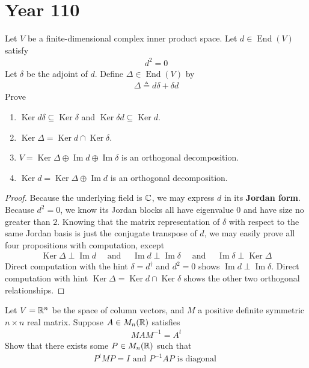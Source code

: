 \documentclass{report}
\begin{document}
\section{Year 110}
\begin{question}{}{}
Let $V$ be a finite-dimensional complex inner product space. Let $d\in \operatorname{End}(V)$ satisfy 
\begin{align*}
d^2=0
\end{align*}
Let $\delta$ be the adjoint of $d$. Define $\Delta \in \operatorname{End}(V)$ by 
\begin{align*}
\Delta \triangleq d\delta + \delta d
\end{align*}
Prove 
\begin{enumerate}[label=(\alph*)]
  \item $\operatorname{Ker}d\delta\subseteq \operatorname{Ker}\delta$ and $\operatorname{Ker}\delta d\subseteq \operatorname{Ker}d$.
  \item  $\operatorname{Ker}\Delta = \operatorname{Ker}d\cap \operatorname{Ker}\delta$. 
  \item $V= \operatorname{Ker}\Delta \oplus  \operatorname{Im}d \oplus  \operatorname{Im}\delta$ is an orthogonal decomposition. 
  \item $\operatorname{Ker}d=\operatorname{Ker}\Delta \oplus  \operatorname{Im}d$ is an orthogonal decomposition. 
\end{enumerate}
\end{question}
\begin{proof}
  Because the underlying field is $\mathbb{C}$, we may express $d$ in its \textbf{Jordan form}. Because $d^2=0$, we know its Jordan blocks all have eigenvalue  $0$ and have size no greater than  $2$. Knowing that the matrix representation of $\delta$ with respect to the same Jordan basis is just the conjugate transpose of $d$, we may easily prove all four propositions with computation, except 
\begin{align*}
  \operatorname{Ker}\Delta \perp \operatorname{Im}d\quad\text{ and }\quad \operatorname{Im}d \perp \operatorname{Im}\delta \quad\text{ and }\quad \operatorname{Im}\delta \perp \operatorname{Ker}\Delta 
\end{align*}
Direct computation with the hint $\delta= d^{\dagger }$ and $d^2=0$ shows  $\operatorname{Im}d\perp \operatorname{Im}\delta$. Direct computation with hint $\operatorname{Ker}\Delta =\operatorname{Ker}d\cap \operatorname{Ker}\delta$ shows the other two orthogonal relationships. 
\end{proof}
\begin{question}{}{}
Let $V=\mathbb{R}^n$ be the space of column vectors, and  $M$ a positive definite symmetric  $n\times n$ real matrix. Suppose $A\in M_{n}(\mathbb{R})$ satisfies 
\begin{align*}
MAM^{-1}=A^t
\end{align*}
Show that there exists some $P \in M_n(\mathbb{R})$ such that 
\begin{align*}
P^t M P = I \text{ and }P^{-1}AP\text{ is diagonal }
\end{align*}
\end{question}
\end{document}
